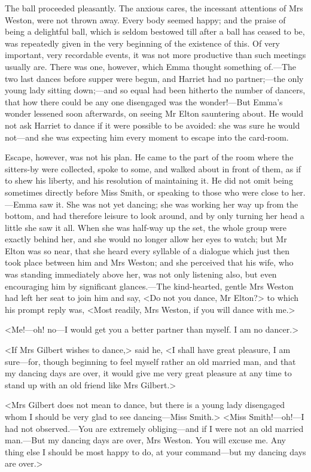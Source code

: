 The ball proceeded pleasantly. The anxious cares, the incessant attentions of Mrs Weston, were not thrown away. Every body seemed happy; and the praise of being a delightful ball, which is seldom bestowed till after a ball has ceased to be, was repeatedly given in the very beginning of the existence of this. Of very important, very recordable events, it was not more productive than such meetings usually are. There was one, however, which Emma thought something of.—The two last dances before supper were begun, and Harriet had no partner;—the only young lady sitting down;—and so equal had been hitherto the number of dancers, that how there could be any one disengaged was the wonder!—But Emma's wonder lessened soon afterwards, on seeing Mr Elton sauntering about. He would not ask Harriet to dance if it were possible to be avoided: she was sure he would not—and she was expecting him every moment to escape into the card-room.

Escape, however, was not his plan. He came to the part of the room where the sitters-by were collected, spoke to some, and walked about in front of them, as if to shew his liberty, and his resolution of maintaining it. He did not omit being sometimes directly before Miss Smith, or speaking to those who were close to her.—Emma saw it. She was not yet dancing; she was working her way up from the bottom, and had therefore leisure to look around, and by only turning her head a little she saw it all. When she was half-way up the set, the whole group were exactly behind her, and she would no longer allow her eyes to watch; but Mr Elton was so near, that she heard every syllable of a dialogue which just then took place between him and Mrs Weston; and she perceived that his wife, who was standing immediately above her, was not only listening also, but even encouraging him by significant glances.—The kind-hearted, gentle Mrs Weston had left her seat to join him and say, <Do not you dance, Mr Elton?> to which his prompt reply was, <Most readily, Mrs Weston, if you will dance with me.>

<Me!—oh! no—I would get you a better partner than myself. I am no dancer.>

<If Mrs Gilbert wishes to dance,> said he, <I shall have great pleasure, I am sure—for, though beginning to feel myself rather an old married man, and that my dancing days are over, it would give me very great pleasure at any time to stand up with an old friend like Mrs Gilbert.>

<Mrs Gilbert does not mean to dance, but there is a young lady disengaged whom I should be very glad to see dancing—Miss Smith.> <Miss Smith!—oh!—I had not observed.—You are extremely obliging—and if I were not an old married man.—But my dancing days are over, Mrs Weston. You will excuse me. Any thing else I should be most happy to do, at your command—but my dancing days are over.>

